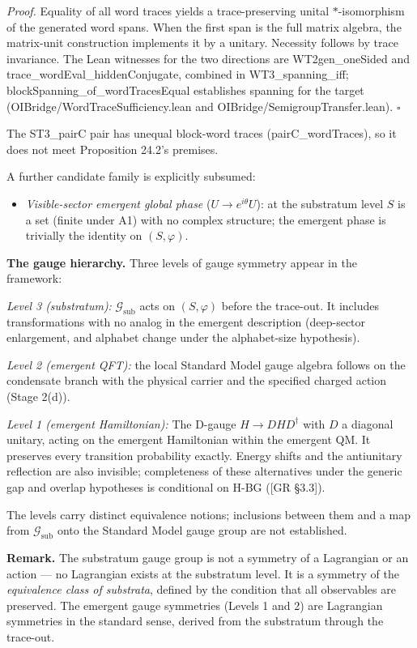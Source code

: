 \documentclass[
]{article}
\providecommand{\tightlist}{%
  \setlength{\itemsep}{0pt}\setlength{\parskip}{0pt}}
\begin{document}
\emph{Proof.} Equality of all word traces yields a trace-preserving
unital \(*\)-isomorphism of the generated word spans. When the first
span is the full matrix algebra, the matrix-unit construction implements
it by a unitary. Necessity follows by trace invariance. The Lean
witnesses for the two directions are WT2gen\_oneSided and
trace\_wordEval\_hiddenConjugate, combined in WT3\_spanning\_iff;
blockSpanning\_of\_wordTracesEqual establishes spanning for the target
(OIBridge/WordTraceSufficiency.lean and
OIBridge/SemigroupTransfer.lean). \(\square\)

The ST3\_pairC pair has unequal block-word traces (pairC\_wordTraces),
so it does not meet Proposition 24.2's premises.

A further candidate family is explicitly subsumed:

\begin{itemize}
\tightlist
\item
  \emph{Visible-sector emergent global phase} (\(U \to e^{i\theta}U\)):
  at the substratum level \(S\) is a set (finite under A1) with no
  complex structure; the emergent phase is trivially the identity on
  \((S, \varphi)\).
\end{itemize}

\textbf{The gauge hierarchy.} Three levels of gauge symmetry appear in
the framework:

\emph{Level 3 (substratum):} \(\mathcal{G}_{\text{sub}}\) acts on
\((S, \varphi)\) before the trace-out. It includes transformations with
no analog in the emergent description (deep-sector enlargement, and
alphabet change under the alphabet-size hypothesis).

\emph{Level 2 (emergent QFT):} the local Standard Model gauge algebra
follows on the condensate branch with the physical carrier and the
specified charged action (Stage 2(d)).

\emph{Level 1 (emergent Hamiltonian):} The D-gauge \(H \to DHD^\dagger\)
with \(D\) a diagonal unitary, acting on the emergent Hamiltonian within
the emergent QM. It preserves every transition probability exactly.
Energy shifts and the antiunitary reflection are also invisible;
completeness of these alternatives under the generic gap and overlap
hypotheses is conditional on H-BG ({[}GR §3.3{]}).

The levels carry distinct equivalence notions; inclusions between them
and a map from \(\mathcal{G}_{\text{sub}}\) onto the Standard Model
gauge group are not established.

\textbf{Remark.} The substratum gauge group is not a symmetry of a
Lagrangian or an action --- no Lagrangian exists at the substratum
level. It is a symmetry of the \emph{equivalence class of substrata},
defined by the condition that all observables are preserved. The
emergent gauge symmetries (Levels 1 and 2) are Lagrangian symmetries in
the standard sense, derived from the substratum through the trace-out.
\end{document}
